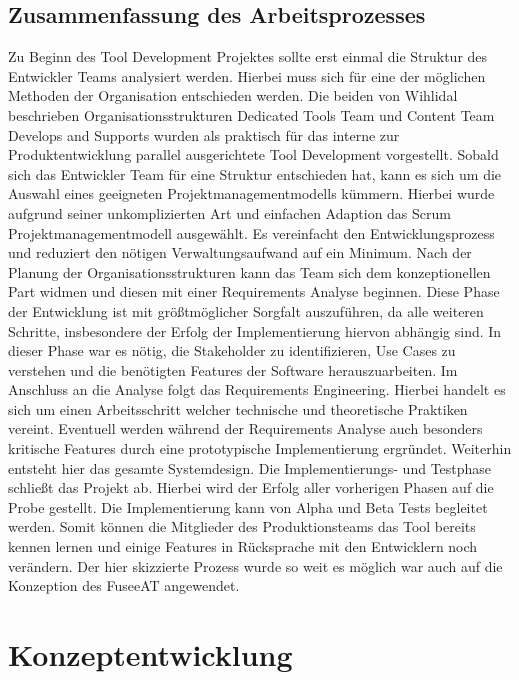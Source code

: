 \documentclass[pagesize, paper=a4, fontsize=12pt, titlepage=true, headings=small, headnosepline, abstractoff, liststotoc, nochapterprefix, plainheadsepline, twoside]{scrreprt}
\begin{document}
\section{Zusammenfassung des Arbeitsprozesses}
Zu Beginn des Tool Development Projektes sollte erst einmal die Struktur des Entwickler Teams analysiert werden. Hierbei muss sich für eine der möglichen Methoden der Organisation entschieden werden. Die beiden von Wihlidal \cite[S. ]{Wihlidal2006} beschrieben Organisationsstrukturen \glqq Dedicated Tools Team\grqq{} und \glqq Content Team Develops and Supports\grqq{} wurden als praktisch für das interne zur Produktentwicklung parallel ausgerichtete Tool Development vorgestellt. Sobald sich das Entwickler Team für eine Struktur entschieden hat, kann es sich um die Auswahl eines geeigneten Projektmanagementmodells kümmern. Hierbei wurde aufgrund seiner unkomplizierten Art und einfachen Adaption das Scrum Projektmanagementmodell ausgewählt. Es vereinfacht den Entwicklungsprozess und reduziert den nötigen Verwaltungsaufwand auf ein Minimum.
Nach der Planung der Organisationsstrukturen kann das Team sich dem konzeptionellen Part widmen und diesen mit einer Requirements Analyse beginnen. Diese Phase der Entwicklung ist mit größtmöglicher Sorgfalt auszuführen, da alle weiteren Schritte, insbesondere der Erfolg der Implementierung hiervon abhängig sind. In dieser Phase war es nötig, die Stakeholder zu identifizieren, Use Cases zu verstehen und die benötigten Features der Software herauszuarbeiten. Im Anschluss an die Analyse folgt das Requirements Engineering. Hierbei handelt es sich um einen Arbeitsschritt welcher technische und theoretische Praktiken vereint. Eventuell werden während der Requirements Analyse auch besonders kritische Features durch eine prototypische Implementierung ergründet. Weiterhin entsteht hier das gesamte Systemdesign.
Die Implementierungs- und Testphase schließt das Projekt ab. Hierbei wird der Erfolg aller vorherigen Phasen auf die Probe gestellt. Die Implementierung kann von Alpha und Beta Tests begleitet werden. Somit können die Mitglieder des Produktionsteams das Tool bereits kennen lernen und einige Features in Rücksprache mit den Entwicklern noch verändern.
Der hier skizzierte Prozess wurde so weit es möglich war auch auf die Konzeption des FuseeAT angewendet.

\chapter{Konzeptentwicklung}
\end{document}
